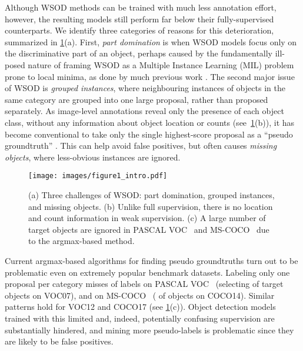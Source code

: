 \documentclass[runningheads]{llncs}
\begin{document}
Although WSOD methods can be trained with much less annotation effort, however, the resulting models still perform far below their fully-supervised counterparts.
We identify three categories of reasons for this deterioration, summarized in \cref{fig:figure1}(a).
First, \emph{part domination} is when WSOD models focus only on the discriminative part of an object,
perhaps caused by the fundamentally ill-posed nature of framing WSOD as a Multiple Instance Learning (MIL) problem \cite{dietterich1997solving} prone to local minima,
as done by much previous work \cite{Bilen_2016_CVPR,Tang_2017_CVPR,Wan_2019_CVPR}.
The second major issue of WSOD is \emph{grouped instances},
where 
neighbouring instances of objects in the same category are grouped into one large proposal, rather than proposed separately.
As image-level annotations reveal only the presence of each object class, without any information about object location or counts (see~\cref{fig:figure1}(b)), it has become conventional to take only the single highest-score proposal as a ``pseudo groundtruth'' \cite{Bilen_2016_CVPR,Tang_2017_CVPR,huang2020comprehensive}.
This can help avoid false positives,
but
often causes \emph{missing objects}, where less-obvious instances are ignored. 

\begin{figure}[t!]
\centering
\texttt{[image: images/figure1\_intro.pdf]}
\caption{(a) Three challenges of WSOD: part domination, grouped instances, and missing objects. (b) Unlike full supervision, there is no location and count information in weak supervision. (c) A large number of target objects are ignored in PASCAL VOC~\cite{Everingham15} and MS-COCO~\cite{lin2014microsoft} due to the argmax-based method.}
\label{fig:figure1}
\end{figure}

Current argmax-based algorithms for finding pseudo groundtruths turn out to be problematic even on extremely popular benchmark datasets.
Labeling only one proposal per category misses  of labels on PASCAL VOC~\cite{Everingham15} (selecting  of  target objects on VOC07),
and  on MS-COCO~\cite{lin2014microsoft} ( of  objects on COCO14).
Similar patterns hold for VOC12 and COCO17 (see \cref{fig:figure1}(c)).
Object detection models trained with this limited and, indeed, potentially confusing supervision are substantially hindered,
and mining more pseudo-labels is problematic since they are likely to be false positives.
\end{document}
